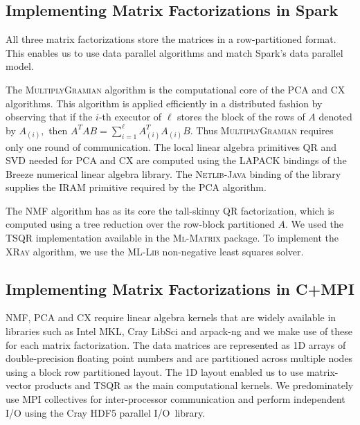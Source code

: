 \subsection{Implementing Matrix Factorizations in Spark}

All three matrix factorizations store the matrices in a row-partitioned format. This enables us to use data parallel algorithms and match Spark's data parallel model.

The \textsc{MultiplyGramian} algorithm is the computational core of the PCA and CX algorithms.
This algorithm is applied efficiently in a distributed fashion by observing that if the $i$-th executor of $\ell$ stores the block of the rows of $A$ denoted by $A_{(i)},$ then $A^TA B = \sum_{i=1}^\ell A_{(i)}^T A_{(i)} B.$ Thus \textsc{MultiplyGramian} requires only one round of communication.  The local linear algebra primitives \textsc{QR} and \textsc{SVD} needed for PCA and CX are computed using the \textsc{LAPACK} bindings of the Breeze numerical linear algebra library.  The \textsc{Netlib-Java} binding of the  library supplies the \textsc{IRAM} primitive required by the PCA algorithm. 

The NMF algorithm has as its core the tall-skinny QR factorization, which is computed using a tree reduction over the row-block partitioned $A$.
We used the \textsc{TSQR} implementation available in the \textsc{Ml-Matrix} package. To implement the \textsc{XRay} algorithm, we use the \textsc{ML-Lib} non-negative least squares solver.


\subsection{Implementing Matrix Factorizations in C+MPI}
NMF, PCA and CX require linear algebra kernels that are widely available in libraries such as Intel MKL, Cray LibSci and arpack-ng and we make use of these for each matrix factorization. The data matrices are represented as 1D arrays of double-precision floating point numbers and are partitioned across multiple nodes using a block row partitioned layout. The 1D layout enabled us to use matrix-vector products and TSQR as the main computational kernels. We predominately use MPI collectives for inter-processor communication and perform independent I/O using the Cray HDF5 parallel I/O~library.  
